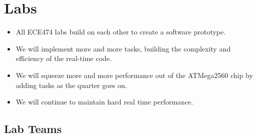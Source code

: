\section{Labs}
\begin{itemize}
  \item All ECE474 labs build on each other to create a software prototype.
  \item We will implement more and more tasks, building the complexity and 
  efficiency of the real-time code. 
  \item We will squeeze more and more performance out of the ATMega2560 chip 
  by adding tasks as the quarter goes on.
  \item We will continue to maintain hard real time performance.
\end{itemize}



\subsection{Lab Teams}

